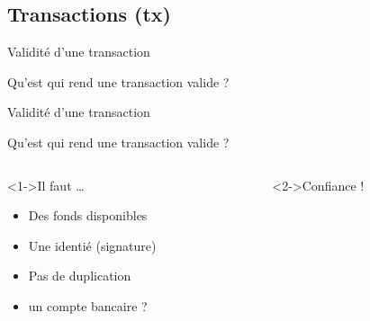 \documentclass[presentation]{beamer}
\begin{document}
\subsection{Transactions (tx)}
\label{sec:org3c51484}
\begin{frame}[label={sec:org1c6804f}]{Validité d'une transaction}
\begin{block}{Qu'est qui rend une transaction valide ?}
\end{block}
\end{frame}
\begin{frame}[label={sec:orge385b69}]{Validité d'une transaction}
\begin{block}{Qu'est qui rend une transaction valide ?}
\end{block}
\begin{columns}
\begin{column}{0.4\columnwidth}
\begin{block}<1->{Il faut \ldots{}}
\begin{itemize}
\item Des fonds disponibles
\item Une identié  (signature)
\item Pas de duplication
\item <2> un compte bancaire ?
\end{itemize}
\end{block}
\end{column}
\begin{column}{0.6\columnwidth}
\begin{block}<2->{Confiance !}
\end{block}
\end{column}
\end{columns}
\end{frame}
\end{document}
